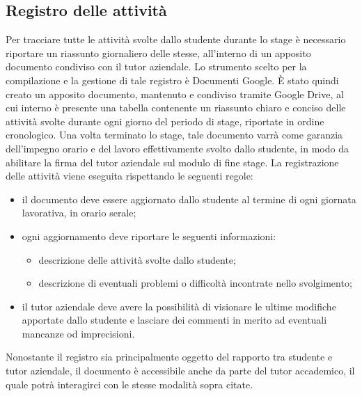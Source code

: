	\subsection{Registro delle attività}
		Per tracciare tutte le attività svolte dallo studente durante lo stage è necessario riportare un riassunto giornaliero delle stesse, all’interno di un apposito documento condiviso con il tutor aziendale.
		\newline
		Lo strumento scelto per la compilazione e la gestione di tale registro è Documenti Google. È stato quindi creato un apposito documento, mantenuto e condiviso tramite Google Drive, al cui interno è presente una tabella contenente un riassunto chiaro e conciso delle attività svolte durante ogni giorno del periodo di stage, riportate in ordine cronologico.
		\newline
		Una volta terminato lo stage, tale documento varrà come garanzia dell'impegno orario e del lavoro effettivamente svolto dallo studente, in modo da abilitare la firma del tutor aziendale sul modulo di fine stage.
		\newline
		La registrazione delle attività viene eseguita rispettando le seguenti regole:
		\begin{itemize}
			\item il documento deve essere aggiornato dallo studente al termine di ogni giornata lavorativa, in orario serale;
			\item ogni aggiornamento deve riportare le seguenti informazioni:
			\begin{itemize}
				\item descrizione delle attività svolte dallo studente;
				\item descrizione di eventuali problemi o difficoltà incontrate nello svolgimento;
			\end{itemize}
			\item il tutor aziendale deve avere la possibilità di visionare le ultime modifiche apportate dallo studente e lasciare dei commenti in merito ad eventuali mancanze od imprecisioni.
		\end{itemize}
		Nonostante il registro sia principalmente oggetto del rapporto tra studente e tutor aziendale, il documento è accessibile anche da parte del tutor accademico, il quale potrà interagirci con le stesse modalità sopra citate.

	
